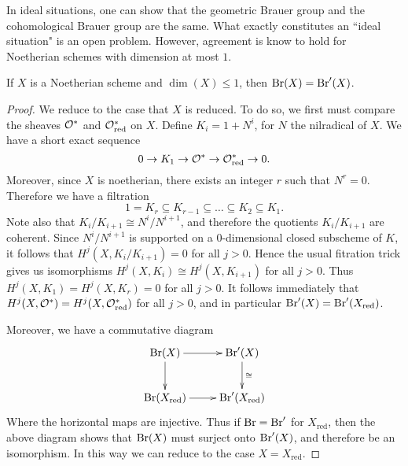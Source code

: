 In ideal situations, one can show that the geometric Brauer group and the cohomological Brauer group are the same.  What exactly constitutes an ``ideal situation" is an open problem.  However, agreement is know to hold for Noetherian schemes with dimension at most $1$.
\begin{prop}
If $X$ is a Noetherian scheme and $\dim(X)\leq 1$, then $\textnormal{Br}(X) = \textnormal{Br}'(X)$.
\end{prop}
\begin{proof}
We reduce to the case that $X$ is reduced.  To do so, we first must compare the sheaves $\mathcal{O}^*$ and $\mathcal{O}_{\text{red}}^*$ on $X$.  Define $K_i = 1 + N^i$, for $N$ the nilradical of $X$.  We have a short exact sequence
$$0\rightarrow K_1\rightarrow \mathcal{O}^*\rightarrow \mathcal{O}_{\text{red}}^*\rightarrow 0.$$
Moreover, since $X$ is noetherian, there exists an integer $r$ such that $N^r = 0$.  Therefore we have a filtration
$$1 = K_r\subseteq K_{r-1}\subseteq \dots\subseteq K_2\subseteq K_1.$$
Note also that $K_i/K_{i+1}\cong N^i/N^{i+1}$, and therefore the quotients $K_i/K_{i+1}$ are coherent.  Since $N^i/N^{i+1}$ is supported on a $0$-dimensional closed subscheme of $K$, it follows that $H^j(X,K_i/K_{i+1})=0$ for all $j>0$.  Hence the usual fitration trick gives us isomorphisms $H^j(X,K_i)\cong H^j(X,K_{i+1})$ for all $j>0$.  Thus $H^j(X,K_1) = H^j(X,K_r) = 0$ for all $j>0$.  It follows immediately that $H^j(X,\mathcal{O}^*) = H^j(X,\mathcal{O}^*_{\text{red}})$ for all $j>0$, and in particular $\textnormal{Br}'(X)=\textnormal{Br}'(X_{\text{red}})$.

Moreover, we have a commutative diagram
$$\xymatrix{
\Br(X)\ar[r]\ar[d] & \Br'(X)\ar[d]^\cong\\
\Br(X_{\text{red}})\ar[r] & \Br'(X_{\text{red}})
}$$
Where the horizontal maps are injective.  Thus if $\textnormal{Br} = \textnormal{Br}'$ for $X_{\text{red}}$, then the above diagram shows that $\textnormal{Br}(X)$ must surject onto $\textnormal{Br}'(X)$, and therefore be an isomorphism.  In this way we can reduce to the case $X = X_{\text{red}}$.


\end{proof}
